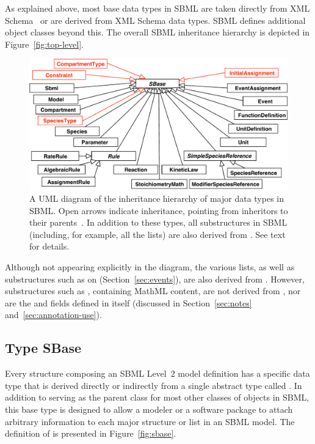 As explained above, most base data types in SBML are taken
directly from XML
Schema~\citep{biron:2000,fallside:2000,thompson:2000} or are
derived from XML Schema data types.  SBML defines additional
object classes beyond this.  The overall SBML inheritance
hierarchy is depicted in Figure~\vref{fig:top-level}.

\begin{figure}[ht]
  \centering
  \includegraphics[scale = 0.7]{figs/top-level}
  \caption{A UML diagram of the inheritance hierarchy of major data types
    in SBML.  Open arrows indicate inheritance, pointing from inheritors to
    their parents~\protect\citep{eriksson:1998,oestereich:1999}.  In addition to
    these types, all substructures in SBML (including, for example, all the
     lists) are also derived from \SBase.  See text
    for details.}
  \label{fig:top-level}
\end{figure}

Although not appearing explicitly in the diagram, the various
 lists, as well as substructures
such as  on \Event (Section~\ref{sec:events}), are
also derived from \SBase.  However, substructures such as
, containing MathML content, are not derived from
\SBase, nor are the  and  fields
defined in \SBase itself (discussed in Section~\ref{sec:notes}
and~\ref{sec:annotation-use}).


\subsection{Type SBase}
\label{sec:sbase}

Every structure composing an SBML Level~2 model definition has a
specific data type that is derived directly or indirectly from a
single abstract type called \SBase.  In addition to
serving as the parent class for most other classes of objects in
SBML, this base type is designed to allow a modeler
or a software package to attach arbitrary information to each major
structure or list in an SBML model.  The definition of \SBase is
presented in Figure~\vref{fig:sbase}.

